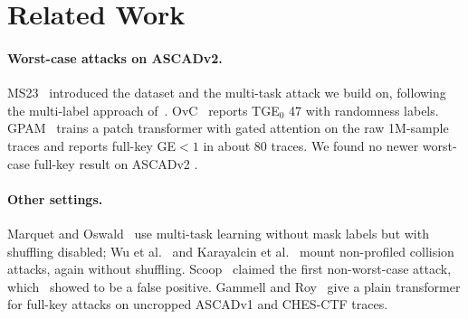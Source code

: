 \section{Related Work}
\label{sec:related}

\paragraph{Worst-case attacks on ASCADv2.} MS23~\cite{MS23} introduced the dataset and the
multi-task attack we build on, following the multi-label approach of~\cite{Maghrebi20}.
OvC~\cite{OvC} reports TGE$_0$ 47 with randomness labels. GPAM~\cite{GPAM} trains a patch
transformer with gated attention on the raw 1M-sample traces and reports full-key GE$<1$ in about 80
traces. We found no newer worst-case full-key result on ASCADv2 .

\paragraph{Other settings.} Marquet and Oswald~\cite{MarquetOswald24} use multi-task learning without
mask labels but with shuffling disabled; Wu et al.~\cite{WPP23} and Karayalcin et al.~\cite{DDPM24}
mount non-profiled collision attacks, again without shuffling. Scoop~\cite{Scoop} claimed the first
non-worst-case attack, which~\cite{ReallyBroken} showed to be a false positive. Gammell and
Roy~\cite{GammellRoy26} give a plain transformer for full-key attacks on uncropped ASCADv1 and
CHES-CTF traces.
